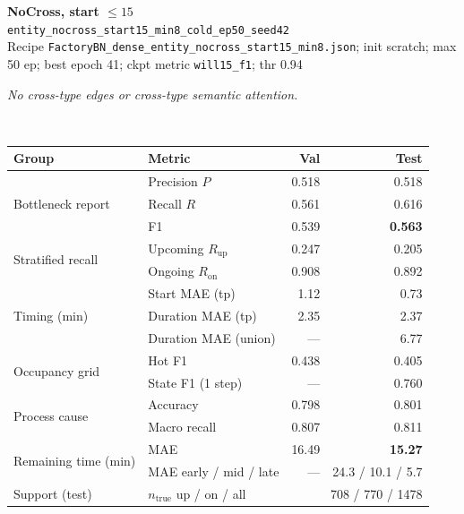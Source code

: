 \documentclass[9pt,a4paper,twocolumn]{extarticle}
\begin{document}
\noindent\begin{minipage}{\columnwidth}
\begin{center}
{\small\bfseries NoCross, start $\le 15$}\\
{\scriptsize\texttt{entity\_nocross\_start15\_min8\_cold\_ep50\_seed42}}\\
{\scriptsize Recipe \texttt{FactoryBN\_dense\_entity\_nocross\_start15\_min8.json}; init scratch; max 50 ep; best epoch 41; ckpt metric \texttt{will15\_f1}; thr 0.94}\\[1pt]
\parbox{0.96\columnwidth}{\scriptsize\itshape No cross-type edges or cross-type semantic attention.}\\[2pt]
\scriptsize\setlength{\tabcolsep}{3pt}
\begin{tabular}{llrr}
\toprule
Group & Metric & Val & Test \\
\midrule
\multirow{3}{*}{Bottleneck report}
  & Precision $P$ & 0.518 & 0.518 \\
  & Recall $R$ & 0.561 & 0.616 \\
  & F1 & 0.539 & \textbf{0.563} \\
\midrule
\multirow{2}{*}{Stratified recall}
  & Upcoming $R_{\mathrm{up}}$ & 0.247 & 0.205 \\
  & Ongoing $R_{\mathrm{on}}$ & 0.908 & 0.892 \\
\midrule
\multirow{3}{*}{Timing (min)}
  & Start MAE (tp) & 1.12 & 0.73 \\
  & Duration MAE (tp) & 2.35 & 2.37 \\
  & Duration MAE (union) & --- & 6.77 \\
\midrule
\multirow{2}{*}{Occupancy grid}
  & Hot F1 & 0.438 & 0.405 \\
  & State F1 (1 step) & --- & 0.760 \\
\midrule
\multirow{2}{*}{Process cause}
  & Accuracy & 0.798 & 0.801 \\
  & Macro recall & 0.807 & 0.811 \\
\midrule
\multirow{2}{*}{Remaining time (min)}
  & MAE & 16.49 & \textbf{15.27} \\
  & MAE early / mid / late & --- & 24.3 / 10.1 / 5.7 \\
\midrule
Support (test)
  & $n_{\mathrm{true}}$ up / on / all & \multicolumn{2}{r}{708 / 770 / 1478} \\
\bottomrule
\end{tabular}
\end{center}
\end{minipage}\par\vspace{6pt}
\end{document}
